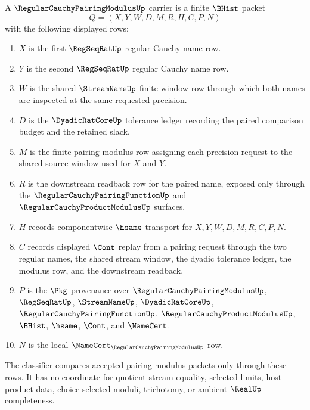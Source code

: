 \begin{definition}
\label{def:regular-cauchy-pairing-modulus-carrier}
A $\RegularCauchyPairingModulusUp$ carrier is a finite $\BHist$ packet
$$
Q=(X,Y,W,D,M,R,H,C,P,N)
$$
with the following displayed rows:
\begin{enumerate}
\item $X$ is the first $\RegSeqRatUp$ regular Cauchy name row.
\item $Y$ is the second $\RegSeqRatUp$ regular Cauchy name row.
\item $W$ is the shared $\StreamNameUp$ finite-window row through which both names are inspected at the same requested precision.
\item $D$ is the $\DyadicRatCoreUp$ tolerance ledger recording the paired comparison budget and the retained slack.
\item $M$ is the finite pairing-modulus row assigning each precision request to the shared source window used for $X$ and $Y$.
\item $R$ is the downstream readback row for the paired name, exposed only through the $\RegularCauchyPairingFunctionUp$ and $\RegularCauchyProductModulusUp$ surfaces.
\item $H$ records componentwise $\hsame$ transport for $X,Y,W,D,M,R,C,P,N$.
\item $C$ records displayed $\Cont$ replay from a pairing request through the two regular names, the shared stream window, the dyadic tolerance ledger, the modulus row, and the downstream readback.
\item $P$ is the $\Pkg$ provenance over $\RegularCauchyPairingModulusUp$, $\RegSeqRatUp$, $\StreamNameUp$, $\DyadicRatCoreUp$, $\RegularCauchyPairingFunctionUp$, $\RegularCauchyProductModulusUp$, $\BHist$, $\hsame$, $\Cont$, and $\NameCert$.
\item $N$ is the local $\NameCert_{\RegularCauchyPairingModulusUp}$ row.
\end{enumerate}
The classifier compares accepted pairing-modulus packets only through these rows. It has no coordinate for quotient stream equality, selected limits, host product data, choice-selected moduli, trichotomy, or ambient $\RealUp$ completeness.
\end{definition}

